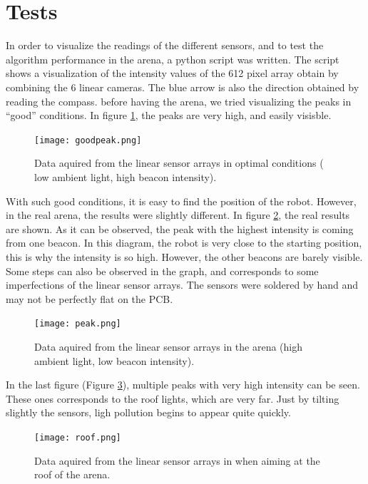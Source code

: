 \section{Tests}

In order to visualize the readings of the different sensors, and to test the algorithm performance in the arena, a python script was written. The script shows a visualization of the intensity values of the 612 pixel array obtain by combining the 6 linear cameras. The blue arrow is also the direction obtained by reading the compass.
 before having the arena, we tried visualizing the peaks in ``good'' conditions. In figure \ref{fig:goodpeak}, the peaks are very high, and easily visisble. 

\begin{figure}[H]
\centering
\texttt{[image: goodpeak.png]}
\caption{Data aquired from the linear sensor arrays in optimal conditions ( low ambient light, high beacon intensity).}
\label{fig:goodpeak}
\end{figure}

With such good conditions, it is easy to find the position of the robot. However, in the real arena, the results were slightly different. In figure \ref{fig:peak}, the real results are shown. As it can be observed, the peak with the highest intensity is coming from one beacon. In this diagram, the robot is very close to the starting position, this is why the intensity is so high. However, the other beacons are barely visible. Some steps can also be observed in the graph, and corresponds to some imperfections of the linear sensor arrays. The sensors were soldered by hand and may not be perfectly flat on the PCB.

\begin{figure}[H]
\centering
\texttt{[image: peak.png]}
\caption{Data aquired from the linear sensor arrays in the arena (high ambient light, low beacon intensity).}
\label{fig:peak}
\end{figure}

In the last figure (Figure \ref{fig:roof}), multiple peaks with very high intensity can be seen. These ones corresponds to the roof lights, which are very far. Just by tilting slightly the sensors, ligh pollution begins to appear quite quickly.

\begin{figure}[H]
\centering
\texttt{[image: roof.png]}
\caption{Data aquired from the linear sensor arrays in when aiming at the roof of the arena.}
\label{fig:roof}
\end{figure}